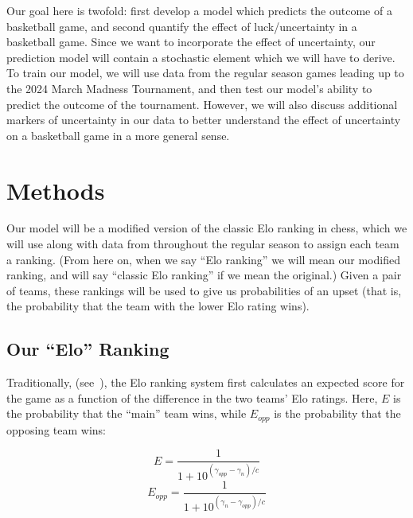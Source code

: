 \documentclass{article}
\begin{document}
Our goal here is twofold: first develop a model which predicts the outcome of a basketball game, and second quantify the effect of luck/uncertainty in a basketball game. Since we want to incorporate the effect of uncertainty, our prediction model will contain a stochastic element which we will have to derive. To train our model, we will use data from the regular season games leading up to the 2024 March Madness Tournament, and then test our model's ability to predict the outcome of the tournament. However, we will also discuss additional markers of uncertainty in our data to better understand the effect of uncertainty on a basketball game in a more general sense. 


\section{Methods}

Our model will be a modified version of the classic Elo ranking in chess, which we will use along with data from throughout the regular season to assign each team a ranking. (From here on, when we say ``Elo ranking'' we will mean our modified ranking, and will say ``classic Elo ranking'' if we mean the original.) Given a pair of teams, these rankings will be used to give us probabilities of an upset (that is, the probability that the team with the lower Elo rating wins). 


\subsection{Our ``Elo'' Ranking}
Traditionally, (see~\cite{mediumRatingSystem}), the Elo ranking system first calculates an expected score for the game as a function of the difference in the two teams' Elo ratings. Here, $E$ is the probability that the ``main'' team wins, while $E_{opp}$ is the probability that the opposing team wins:

\begin{equation}\label{eq:E}
E = \frac{1}{1+10^{(\gamma_{opp}-\gamma_n)/c}}
\end{equation}
\begin{equation}\label{eq:E}
E_{opp} = \frac{1}{1+10^{(\gamma_n-\gamma_{opp})/c}}
\end{equation}
\end{document}
